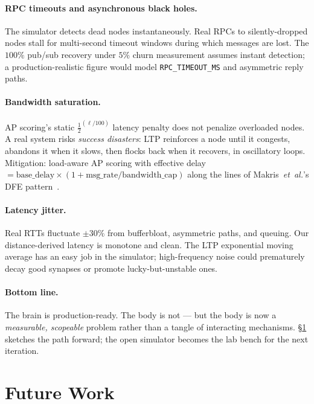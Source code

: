 \documentclass[conference]{IEEEtran}
\begin{document}
\paragraph{RPC timeouts and asynchronous black holes.} The simulator
detects dead nodes instantaneously. Real RPCs to silently-dropped
nodes stall for multi-second timeout windows during which messages
are lost. The $100\%$ pub/sub recovery under $5\%$ churn measurement
assumes instant detection; a production-realistic figure would model
\texttt{RPC\_TIMEOUT\_MS} and asymmetric reply paths.

\paragraph{Bandwidth saturation.} AP scoring's static
$\frac{1}{2}^{(\ell/100)}$ latency penalty does not penalize overloaded
nodes. A real system risks \emph{success disasters}: LTP reinforces
a node until it congests, abandons it when it slows, then flocks back
when it recovers, in oscillatory loops. Mitigation: load-aware AP
scoring with effective delay $= \mathrm{base\_delay} \times (1 +
\mathrm{msg\_rate} / \mathrm{bandwidth\_cap})$ along the lines of
Makris~\emph{et~al.}'s DFE pattern~\cite{makris2017novel}.

\paragraph{Latency jitter.} Real RTTs fluctuate $\pm 30\%$ from
bufferbloat, asymmetric paths, and queuing. Our distance-derived
latency is monotone and clean. The LTP exponential moving average has
an easy job in the simulator; high-frequency noise could prematurely
decay good synapses or promote lucky-but-unstable ones.

\paragraph{Bottom line.} The brain is production-ready. The body
is not --- but the body is now a \emph{measurable, scopeable} problem
rather than a tangle of interacting mechanisms.
\S\ref{sec:future} sketches the path forward; the open simulator
becomes the lab bench for the next iteration.

\section{Future Work}
\label{sec:future}
\end{document}
